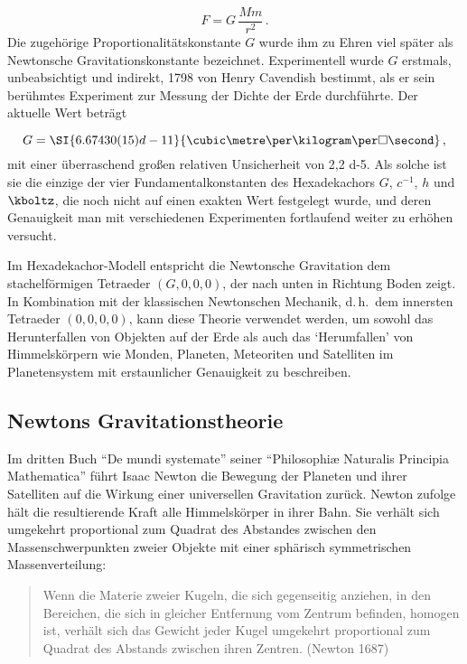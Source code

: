 \documentclass{scrartcl}
\begin{document}
\begin{equation*}\label{eq:gravitation}
  F=G\,\frac{Mm}{r^2}\,.
\end{equation*}
%
Die zugehörige Proportionalitätskonstante $G$ wurde ihm zu Ehren viel später als Newtonsche Gravitationskonstante bezeichnet. Experimentell wurde $G$ erstmals, unbeabsichtigt und indirekt, 1798 von Henry Cavendish bestimmt, als er sein berühmtes Experiment zur Messung der Dichte der Erde durchführte. Der aktuelle Wert beträgt

\begin{equation*}
  G = \SI{6.67430(15)d-11}{\cubic\metre\per\kilogram\per\square\second}\,,
\end{equation*}
%
mit einer überraschend großen relativen Unsicherheit von \num{2,2 d-5}. Als solche ist sie die einzige der vier Fundamentalkonstanten des Hexadekachors $G$, $c^{-1}$, $h$ und $\kboltz$, die noch nicht auf einen exakten Wert festgelegt wurde, und deren Genauigkeit man mit verschiedenen Experimenten fortlaufend weiter zu erhöhen versucht.

Im Hexadekachor-Modell entspricht die Newtonsche Gravitation dem stachelförmigen Tetraeder $(G,0,0,0)$, der nach unten in Richtung Boden zeigt. In Kombination mit der klassischen Newtonschen Mechanik, d.\,h.\ dem innersten Tetraeder $(0,0,0,0)$, kann diese Theorie verwendet werden, um sowohl das Herunterfallen von Objekten auf der Erde als auch das \enquote*{Herumfallen} von Himmelskörpern wie Monden, Planeten, Meteoriten und Satelliten im Planetensystem mit erstaunlicher Genauigkeit zu beschreiben.


\subsection*{Newtons Gravitationstheorie}

Im dritten Buch \enquote{De mundi systemate} seiner \enquote{Philosophiæ Naturalis Principia Mathematica} führt Isaac Newton die Bewegung der Planeten und ihrer Satelliten auf die Wirkung einer universellen Gravitation zurück. Newton zufolge hält die resultierende Kraft alle Himmelskörper in ihrer Bahn. Sie verhält sich umgekehrt proportional zum Quadrat des Abstandes zwischen den Massenschwerpunkten zweier Objekte mit einer sphärisch symmetrischen Massenverteilung:

\begin{quote}
  Wenn die Materie zweier Kugeln, die sich gegenseitig anziehen, in den Bereichen, die sich in gleicher Entfernung vom Zentrum befinden, homogen ist, verhält sich das Gewicht jeder Kugel umgekehrt proportional zum Quadrat des Abstands zwischen ihren Zentren. (Newton 1687)
\end{quote}
\end{document}
